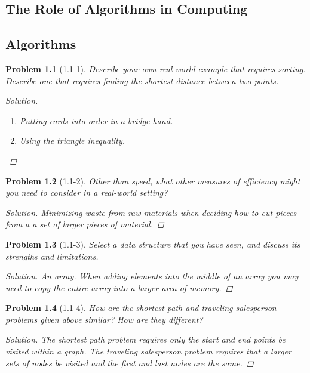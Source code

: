 \documentclass[oneside]{book}
\newtheorem{problem}{Problem}
\begin{document}
\mainmatter
\begin{spacing}{1.618}
\chapter{The Role of Algorithms in Computing}
\section{Algorithms}

\begin{problem}[1.1-1]
Describe your own real-world example that requires sorting. Describe one that requires finding the shortest distance between two points.
\begin{proof}[Solution] \ \par
	\begin{enumerate}
		\item Putting cards into order in a bridge hand. 
		\item Using the triangle inequality. 
	\end{enumerate}
\end{proof}
\end{problem}

\begin{problem}[1.1-2]
	Other than speed, what other measures of efficiency might you need to consider in a real-world setting?
	\begin{proof}[Solution]
		Minimizing waste from raw materials when deciding how to cut pieces from a a set of larger pieces of material. 
	\end{proof}
\end{problem}

\begin{problem}[1.1-3]
	Select a data structure that you have seen, and discuss its strengths and limitations.
	\begin{proof}[Solution]
		An array. When adding elements into the middle of an array you may need to copy the entire array into a larger area of memory. 
	\end{proof}
\end{problem}

\begin{problem}[1.1-4]
	How are the shortest-path and traveling-salesperson problems given above similar?
	How are they different?
	\begin{proof}[Solution]
		The shortest path problem requires only the start and end points be visited within a graph. The traveling salesperson problem requires that a larger sets of nodes be visited and the first and last nodes are the same. 
	\end{proof}
\end{problem}


\end{spacing}
\end{document}
